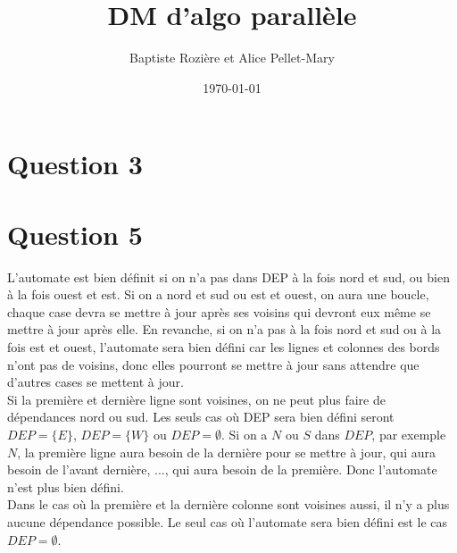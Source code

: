 \documentclass[a4paper,11pt]{article}
\title{DM d'algo parallèle}
\author{Baptiste Rozière et Alice Pellet-Mary}
\date{\today}
\begin{document}
\maketitle

\section*{Question 3}


\section*{Question 5}
L'automate est bien définit si on n'a pas dans DEP à la fois nord et sud, ou bien à la fois ouest et est. Si on a nord et sud ou est et ouest, on aura une boucle, chaque case devra se mettre à jour après ses voisins qui devront eux même se mettre à jour après elle.
En revanche, si on n'a pas à la fois nord et sud ou à la fois est et ouest, l'automate sera bien défini car les lignes et colonnes des bords n'ont pas de voisins, donc elles pourront se mettre à jour sans attendre que d'autres cases se mettent à jour.\\
Si la première et dernière ligne sont voisines, on ne peut plus faire de dépendances nord ou sud. Les seuls cas où DEP sera bien défini seront $DEP = \{E\}$, $DEP = \{W\}$ ou $DEP = \emptyset$. Si on a $N$ ou $S$ dans $DEP$, par exemple $N$, la première ligne aura besoin de la dernière pour se mettre à jour, qui aura besoin de l'avant dernière, ..., qui aura besoin de la première. Donc l'automate n'est plus bien défini.\\
Dans le cas où la première et la dernière colonne sont voisines aussi, il n'y a plus aucune dépendance possible. Le seul cas où l'automate sera bien défini est le cas $DEP = \emptyset$.
\end{document}
